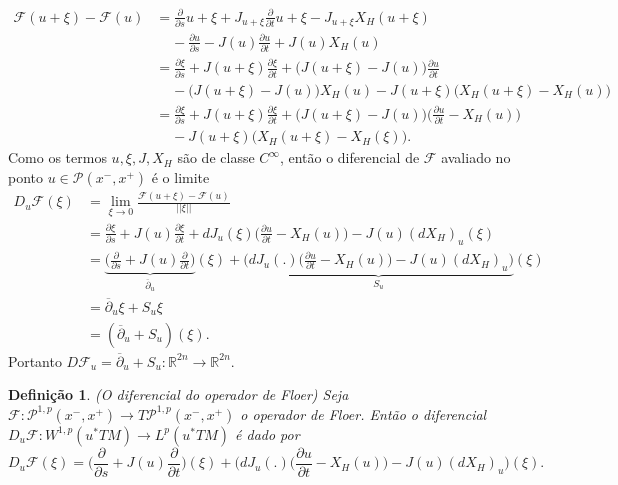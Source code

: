 \documentclass[12pt]{book}
\newtheorem{definicao}[teorema]{Definição}
\newcommand{\bigparenteses}[1]{\Big( #1 \Big) }
\newcommand{\caminhosexponenciaisconectantesabrev}{\mathcal{P}(x^{-},x^{+})}
\newcommand{\caminhosexponenciaisconectantes}[2]{\mathcal{P}^{1,p}(#1, #2)}
\newcommand{\caminhosexponenciaisconectantespadrao}{\caminhosexponenciaisconectantes{x^{-}}{x^{+}}}
\newcommand{\campohamiltoniano}[1]{X_{H}(#1)}
\newcommand{\diferencialfloerponto}[1]{D_{#1}\operadorFloer}
\newcommand{\derivadaparcial}[2]{\frac{\partial #1}{\partial #2}}
\newcommand{\diferencialhamiltoniano}[1]{(dX_{H})_{#1}}
\newcommand{\espacoLp}[1]{L^{p}(#1)}
\newcommand{\espacosobolev}[1]{W^{1,p}(#1)}
\newcommand{\operadorFloer}{\mathcal{F}}
\newcommand{\operadorFloerDefinicao}[1]{\derivadaparcial{}{s}#1 + J_{#1}\derivadaparcial{}{t}#1 - J_{#1}X_{H}(#1)}
\newcommand{\operadorFloerParametro}[1]{\mathcal{F}(#1)}
\newcommand{\norma}[1]{||#1||}
\newcommand{\operadorcauchyabrev}[1]{\overline{\partial}_{#1}}
\newcommand{\pullbackfibradotangente}[2]{#1^{*}T#2}
\newcommand{\pullbackfibradotangenteM}[1]{\pullbackfibradotangente{#1}{M}}
\newcommand{\real}[1]{\mathbb{R}^{#1}}
\begin{document}
	$$
	\begin{aligned}
	\operadorFloerParametro{u+\xi}-\operadorFloerParametro{u}
	&= \operadorFloerDefinicao{u+\xi}
	\\
	&\;\;\;\; -\derivadaparcial{u}{s} - J(u)\derivadaparcial{u}{t} + J(u)\campohamiltoniano{u}
	\\
	&=\derivadaparcial{\xi}{s}+J(u+\xi)\derivadaparcial{\xi}{t}+\bigparenteses{J(u+\xi)-J(u)}\derivadaparcial{u}{t}
	\\
	&\;\;\;\;-\bigparenteses{J(u+\xi)-J(u)}\campohamiltoniano{u} 
	-J(u+\xi)\bigparenteses{\campohamiltoniano{u+\xi}-\campohamiltoniano{u}}
	\\
	&=\derivadaparcial{\xi}{s} + J(u+\xi)\derivadaparcial{\xi}{t} + \bigparenteses{J(u+\xi)-J(u)}\bigparenteses{\derivadaparcial{u}{t} - X_{H}(u)}  
	\\
	&\;\;\;\; -J(u+\xi)\bigparenteses{X_{H}(u+\xi) - X_{H}(\xi)}.
	\end{aligned}
	$$
	Como os termos $u, \xi, J, X_{H}$ são de classe $C^{\infty}$, então o diferencial de $\operadorFloer$ avaliado no ponto $u\in \caminhosexponenciaisconectantesabrev$ é o limite 
	$$
	\begin{aligned}
	\diferencialfloerponto{u}(\xi)
	&=\lim_{\xi \to 0} \frac{	\operadorFloerParametro{u+\xi}-\operadorFloerParametro{u}}{\norma{\xi}}
	\\
	&= \derivadaparcial{\xi}{s} + J(u)\derivadaparcial{\xi}{t}+ dJ_{u}(\xi)\bigparenteses{\derivadaparcial{u}{t} - X_{H}(u)} - J(u) \diferencialhamiltoniano{u}(\xi)
	\\
	&= \underbrace{\Big( \derivadaparcial{}{s} + J(u)\derivadaparcial {}{t}\Big)}_{\overline{\partial}_{u}}(\xi)+ \underbrace{\Big(dJ_{u}(.)\bigparenteses{\derivadaparcial{u}{t} - X_{H}(u)} - J(u) \diferencialhamiltoniano{u}\Big)}_{S_{u}}(\xi)
	\\
	&= \operadorcauchyabrev{u} \xi + S_{u}\xi
	\\
	&= (\operadorcauchyabrev{u}  + S_{u})(\xi).
	\end{aligned}
	$$
	Portanto $ D\operadorFloer_{u}= \operadorcauchyabrev{u}  + S_{u}: \real{2n} \to \real{2n}$.

	\begin{definicao}
		(O diferencial do operador de Floer) Seja $\operadorFloer: \caminhosexponenciaisconectantespadrao \to T\caminhosexponenciaisconectantespadrao $ o operador de Floer. Então o diferencial $\diferencialfloerponto{u}: \espacosobolev{\pullbackfibradotangenteM{u}}\to \espacoLp{\pullbackfibradotangenteM{u}}$ é dado por
		$$
		\diferencialfloerponto{u}(\xi)= \Big( \derivadaparcial{}{s} + J(u)\derivadaparcial {}{t}\Big)(\xi)+ \Big(dJ_{u}(.)\bigparenteses{\derivadaparcial{u}{t} - X_{H}(u)} - J(u) \diferencialhamiltoniano{u}\Big)(\xi).
		$$
	\end{definicao}
	
\end{document}
